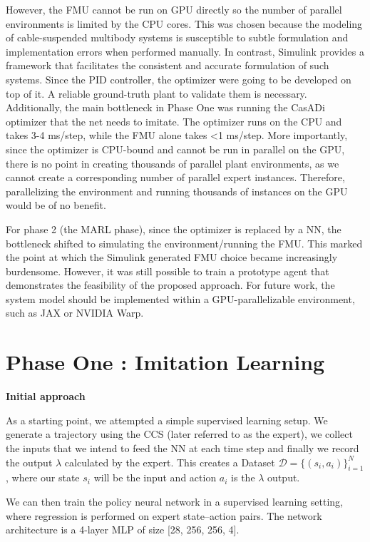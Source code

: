 However, the FMU cannot be run on GPU directly so the number of
parallel environments is limited by the CPU cores. This was chosen
because the modeling of cable-suspended multibody systems is susceptible
to subtle formulation and implementation errors when performed manually.
In contrast, Simulink provides a framework that facilitates the
consistent and accurate formulation of such systems. Since the PID
controller, the optimizer were going to be developed on top of it. A
reliable ground-truth plant to validate them is necessary. Additionally, the
main bottleneck in Phase One was running the CasADi optimizer that the net 
needs to imitate. The optimizer runs on the CPU and takes 3-4 ms/step, while 
the FMU alone takes <1 ms/step. More importantly, since the optimizer is 
CPU-bound and cannot be run in parallel on the GPU, there is no point in 
creating thousands of parallel plant environments, as we cannot create a 
corresponding number of parallel expert instances. Therefore, parallelizing 
the environment and running thousands of instances on the GPU would be of 
no benefit.

For phase 2 (the MARL phase), since the
optimizer is replaced by a NN, the bottleneck shifted to simulating the
environment/running the FMU. This marked the point at which the Simulink 
generated FMU
choice became increasingly burdensome. However, it was still possible to
train a prototype agent that demonstrates the feasibility of the
proposed approach. For future work, the system model should be
implemented within a GPU-parallelizable environment, such as JAX or
NVIDIA Warp.

\section{Phase One : Imitation Learning}

\noindent\textbf{Initial approach}

As a starting point, we attempted a simple supervised learning setup. We
generate a trajectory using the CCS (later referred to as the expert),
we collect the inputs that we intend to feed the NN at each time step
and finally we record the output $\lambda$ calculated by the expert.
This creates a Dataset $\mathcal{D} = \{(s_i, a_i)\}_{i=1}^N$, where our
state $s_i$ will be the input and action $a_i$ is the $\lambda$ output.

We can then train the policy neural network in a supervised learning
setting, where regression is performed on expert state–action pairs.
The network architecture is a 4-layer MLP of size [28, 256, 256, 4].

